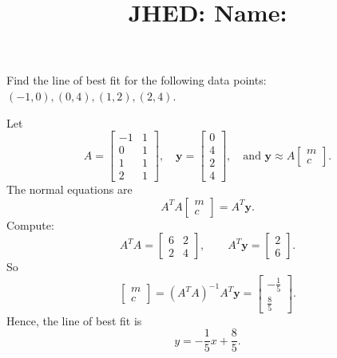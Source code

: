 \documentclass[reqno]{exam}
\title{\normalsize{
  JHED: \underline{\hspace{4cm}} \hspace{1em} Name: \underline{\hspace{9cm}}}
   }
\author{}
\date{}
\begin{document}
\maketitle
\vspace{-2cm} %

\begin{questions}

\question 
Find the line of best fit for the following data points: $(-1, 0), (0, 4), (1, 2), (2, 4)$.
\begin{solution}
Let
\[
A=\begin{bmatrix}
-1 & 1\\
0 & 1\\
1 & 1\\
2 & 1
\end{bmatrix},
\quad
\mathbf y=\begin{bmatrix}
0\\4\\2\\4
\end{bmatrix},
\quad
\text{and } \mathbf y \approx A\begin{bmatrix}m\\c\end{bmatrix}.
\]
The normal equations are
\[
A^TA\begin{bmatrix}m\\c\end{bmatrix}=A^T\mathbf y.
\]
Compute:
\[
A^TA=\begin{bmatrix}6&2\\2&4\end{bmatrix},
\qquad
A^T\mathbf y=\begin{bmatrix}2\\6\end{bmatrix}.
\]
So
\[
\begin{bmatrix}m\\c\end{bmatrix}
=(A^TA)^{-1}A^T\mathbf y
=\begin{bmatrix}-\frac15\\[2pt]\frac85\end{bmatrix}.
\]
Hence, the line of best fit is
\[
y=-\frac15x+\frac85.
\]
\end{solution}

\newpage
\question
{}
\end{questions}
\end{document}
